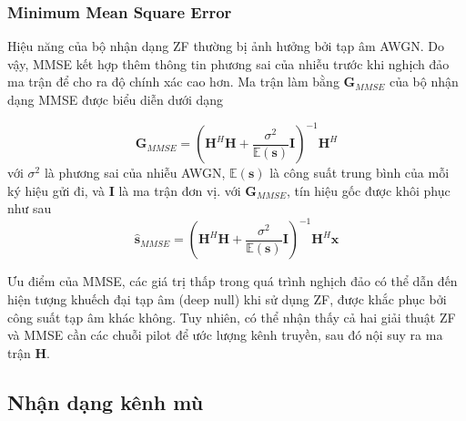 \subsubsection{Minimum Mean Square Error} \label{sec:mmse}

Hiệu năng của bộ nhận dạng ZF thường bị ảnh hưởng bởi tạp âm AWGN. Do vậy, MMSE kết hợp thêm thông tin phương sai của nhiễu trước khi nghịch đảo ma trận để cho ra độ chính xác cao hơn. Ma trận làm bằng $\mathbf{G}_{MMSE}$ của bộ nhận dạng MMSE được biểu diễn dưới dạng

\begin{equation}
    \mathbf{G}_{MMSE}=\left(\mathbf{H}^H \mathbf{H}+\frac{\sigma^2}{\mathbb{E}(\mathbf{s})} \mathbf{I}\right)^{-1} \mathbf{H}^H
\end{equation}
với $\sigma^2$ là phương sai của nhiễu AWGN, $\mathbb{E}(\mathbf{s})$ là công suất trung bình của mỗi ký hiệu gửi đi, và $\mathbf{I}$ là ma trận đơn vị. với $\mathbf{G}_{MMSE}$, tín hiệu gốc được khôi phục như sau
\begin{equation}
    \hat{\mathbf{s}}_{MMSE}=\left(\mathbf{H}^H \mathbf{H}+\frac{\sigma^2}{\mathbb{E}(\mathbf{s})} \mathbf{I}\right)^{-1} \mathbf{H}^H \mathbf{x}
\end{equation}

Ưu điểm của MMSE, các giá trị thấp trong quá trình nghịch đảo có thể dẫn đến hiện tượng khuếch đại tạp âm (deep null) khi sử dụng ZF, được khắc phục bởi công suất tạp âm khác không. Tuy nhiên, có thể nhận thấy cả hai giải thuật ZF và MMSE cần các chuỗi pilot để ước lượng kênh truyền, sau đó nội suy ra ma trận $\mathbf{H}$.

\subsection{Nhận dạng kênh mù} \label{sec:blind}


